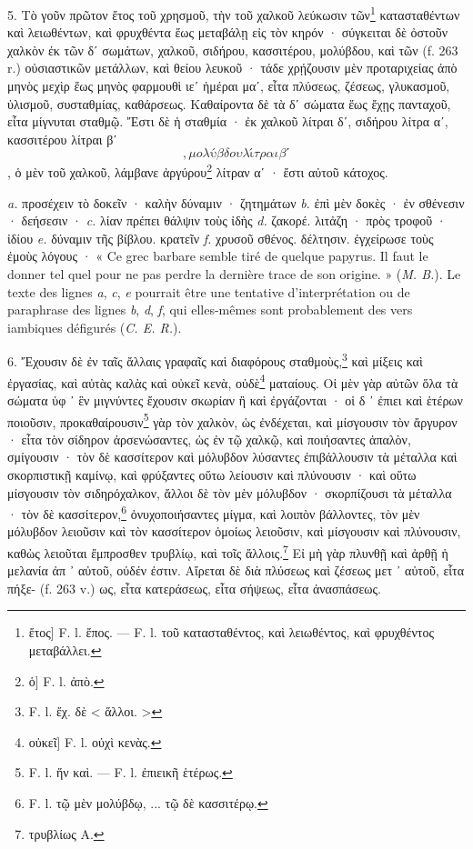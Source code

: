 \documentclass[a4paper, 11pt, oneside, polutonikogreek, french]{article}
\newcommand*\svgA{}
\begin{document}
5. Τὸ γοῦν πρῶτον ἔτος τοῦ χρησμοῦ, τὴν τοῦ χαλκοῦ λεύκωσιν τῶν\footnote{ἔτος] F. l. ἔπος. --- F. l. τοῦ κατασταθέντος, καὶ λειωθέντος, καὶ φρυχθέντος μεταβάλλει.} κατασταθέντων καὶ λειωθέντων, καὶ φρυχθέντα ἕως μεταβάλῃ εἰς τὸν κηρόν · σύγκειται δὲ ὀστοῦν χαλκὸν ἐκ τῶν δʹ σωμάτων, χαλκοῦ, σιδήρου, κασσιτέρου, μολύβδου, καὶ τῶν (f. 263 r.) οὐσιαστικῶν μετάλλων, καὶ θείου λευκοῦ · τάδε χρῄζουσιν μὲν προταριχείας ἀπὸ μηνὸς μεχὶρ ἕως μηνὸς φαρμουθὶ ιεʹ ἡμέραι μαʹ, εἶτα πλύσεως, ζέσεως, γλυκασμοῦ, ὑλισμοῦ, συσταθμίας, καθάρσεως. Καθαίροντα δὲ τὰ δʹ σώματα ἕως ἔχῃς πανταχοῦ, εἶτα μίγνυται σταθμῷ. Ἔστι δὲ ἡ σταθμία · ἐκ χαλκοῦ λίτραι δʹ, σιδήρου λίτρα αʹ, κασσιτέρου λίτραι βʹ $\svgA$, μολύβδου λίτραι βʹ $\svgA$, ὁ μὲν τοῦ χαλκοῦ, λάμβανε ἀργύρου\footnote{ὁ] F. l. ἀπὸ.} λίτραν αʹ · ἔστι αὐτοῦ κάτοχος.

\emph{a.} προσέχειν τὸ δοκεῖν · καλὴν δύναμιν · ζητημάτων  
\emph{b.} ἐπὶ μὲν δοκὲς · ἐν σθένεσιν · δεήσεσιν ·  
\emph{c.} λίαν πρέπει θάλψιν τοὺς ἰδὴς  
\emph{d.} ζακορέ. λιτἀζη · πρὸς τροφοῦ · ἰδίου  
\emph{e.} δύναμιν τῆς βίβλου. κρατεῖν  
\emph{f.} χρυσοῦ σθένος. δέλτησιν. ἐγχείρωσε τοὺς ἐμοὺς λόγους ·  
« Ce grec barbare semble tiré de quelque papyrus. Il faut le donner tel quel pour ne pas perdre la dernière trace de son origine. » (\emph{M. B.}). Le texte des lignes \emph{a}, \emph{c}, \emph{e} pourrait être une tentative d'interprétation ou de paraphrase des lignes \emph{b}, \emph{d}, \emph{f}, qui elles-mêmes sont probablement des vers iambiques défigurés (\emph{C. E. R.}).

6. Ἔχουσιν δὲ ἐν ταῖς ἄλλαις γραφαῖς καὶ διαφόρους σταθμοὺς,\footnote{F. l. ἔχ. δὲ < ἅλλοι. >} καὶ μίξεις καὶ ἐργασίας, καὶ αὐτὰς καλὰς καὶ οὐκεῖ κενὰ, οὐδὲ\footnote{οὐκεῖ] F. l. οὐχὶ κενὰς.} ματαίους. Οἱ μὲν γὰρ αὐτῶν ὅλα τὰ σώματα ὑφ ᾽ ἓν μιγνύντες ἔχουσιν σκωρίαν ἢ καὶ ἐργάζονται · οἱ δ ᾽ ἐπιει καὶ ἑτέρων ποιοῦσιν, προκαθαίρουσιν\footnote{F. l. ἥν καὶ. --- F. l. ἐπιεικῆ ἑτέρως.} γὰρ τὸν χαλκὸν, ὡς ἐνδέχεται, καὶ μίσγουσιν τὸν ἄργυρον · εἶτα τὸν σίδηρον ἀρσενώσαντες, ὡς ἐν τῷ χαλκῷ, καὶ ποιήσαντες ἁπαλὸν, σμίγουσιν · τὸν δὲ κασσίτερον καὶ μόλυβδον λύσαντες ἐπιβάλλουσιν τὰ μέταλλα καὶ σκορπιστικῇ καμίνῳ, καὶ φρύξαντες οὕτω λείουσιν καὶ πλύνουσιν · καὶ οὕτω μίσγουσιν τὸν σιδηρόχαλκον, ἄλλοι δὲ τὸν μὲν μόλυβδον · σκορπίζουσι τὰ μέταλλα · τὸν δὲ κασσίτερον,\footnote{F. l. τῷ μὲν μολύβδῳ, ... τῷ δὲ κασσιτέρῳ.} ὀνυχοποιήσαντες μίγμα, καὶ λοιπὸν βάλλοντες, τὸν μὲν μόλυβδον λειοῦσιν καὶ τὸν κασσίτερον ὁμοίως λειοῦσιν, καὶ μίσγουσιν καὶ πλύνουσιν, καθὼς λειοῦται ἔμπροσθεν τρυβλίῳ, καὶ τοῖς ἄλλοις.\footnote{τρυβλίως A.} Εἰ μὴ γὰρ πλυνθῇ καὶ ἀρθῇ ἡ μελανία ἀπ ᾽ αὐτοῦ, οὐδέν ἐστιν. Αἴρεται δὲ διὰ πλύσεως καὶ ζέσεως μετ ᾽ αὐτοῦ, εἷτα πήξε- (f. 263 v.) ως, εἶτα κατεράσεως, εἶτα σήψεως, εἶτα ἀνασπάσεως.
\end{document}
